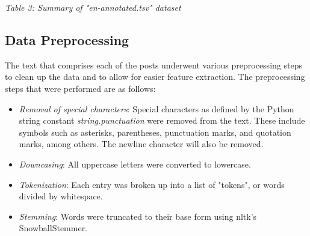 \documentclass[journal]{./IEEE/IEEEtran}
\begin{document}
\begin{table}
    \centering
    \emph{Table 3: Summary of "en-annotated.tsv" dataset}
\end{table}

\subsection{Data Preprocessing}
The text that comprises each of the posts underwent various preprocessing steps to clean up the data and to allow for easier feature extraction. The preprocessing steps that were performed are as follows:

\begin{itemize}
    \item{\emph{Removal of special characters}: Special characters as defined by the Python string constant \emph{string.punctuation} were removed from the text. These include symbols such as asterisks, parentheses, punctuation marks, and quotation marks, among others. The newline character will also be removed.}
    \item{\emph{Downcasing}: All uppercase letters were converted to lowercase.}
    \item {\emph{Tokenization}: Each entry was broken up into a list of "tokens", or words divided by whitespace.}
    \item{\emph{Stemming}: Words were truncated to their base form using nltk's SnowballStemmer.}
\end{itemize}
\end{document}
